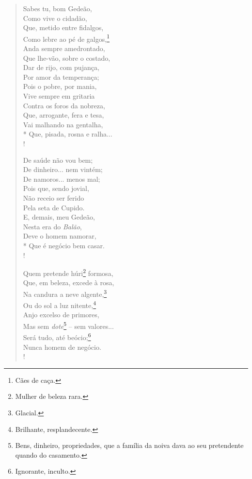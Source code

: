 \begin{verse}
Sabes tu, bom Gedeão,\\
Como vive o cidadão,\\
Que, metido entre fidalgos,\\
Como lebre ao pé de galgos,\footnote{ Cães de caça.}\\
Anda sempre amedrontado,\\
Que lhe-vão, sobre o costado,\\
Dar de rijo, com pujança,\\
Por amor da temperança;\\
Pois o pobre, por mania,\\
Vive sempre em gritaria\\
Contra os foros da nobreza,\\
Que, arrogante, fera e tesa,\\
Vai malhando na gentalha,\\*
Que, pisada, rosna e ralha...\\!

De saúde não vou bem;\\
De dinheiro... nem vintém;\\
De namoros... menos mal;\\
Pois que, sendo jovial,\\
Não receio ser ferido\\
Pela seta de Cupido.\\
E, demais, meu Gedeão,\\
Nesta era do \emph{Balão},\\
Deve o homem namorar,\\*
Que é negócio bem casar.\\!

Quem pretende húri\footnote{ Mulher de beleza rara.} formosa,\\
Que, em beleza, excede à rosa,\\
Na candura a neve algente,\footnote{ Glacial.}\\
Ou do sol a luz nitente,\footnote{ Brilhante, resplandecente.}\\
Anjo excelso de primores,\\
Mas sem \emph{dote}\footnote{ Bens, dinheiro, propriedades, que a
          família da noiva dava ao seu pretendente quando do casamento.}
-- sem valores...\\
Será tudo, até beócio;\footnote{ Ignorante, inculto.}\\
Nunca homem de negócio.\\!


\end{verse}
